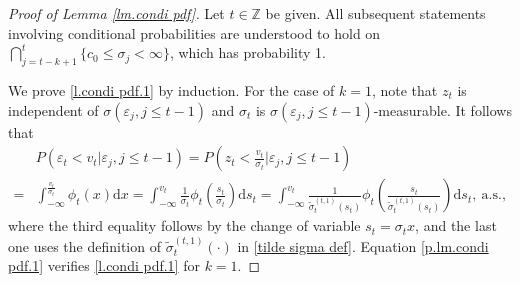 \documentclass[ejsv2]{imsart}
\theoremstyle{plain}
\theoremstyle{definition}
\theoremstyle{remark}
\begin{document}
\begin{proof}[Proof of Lemma \ref{lm.condi pdf}]
Let $t \in \mathbb{Z}$ be given.
All subsequent statements involving
conditional probabilities are understood
to hold on $\bigcap_{j=t-k+1}^{t}\{c_0 \leq \sigma_{j} <\infty\}$, which
has probability 1.

We prove \eqref{l.condi pdf.1} 
by induction.
For the case of $k=1$, note that $z_t$ is independent of $\sigma(\varepsilon_{j},j\leq t-1)$ and 
$\sigma_{t}$ is $\sigma(\varepsilon_j,j\leq t-1)$-measurable. It follows that
\begin{equation}\label{p.lm.condi pdf.1}
\begin{split}
    &P(\varepsilon_t<v_t|\varepsilon_{j},j\leq t-1)= P(z_t<\frac{v_t}{\sigma_{t}}|\varepsilon_{j},j\leq t-1) \\
    =&  \int_{-\infty}^{\frac{v_t}{\sigma_{t}}}\phi_t(x)\mathrm{d}x 
   = \int_{-\infty}^{v_{t}}\frac{1}{\sigma_{t}}\phi_{t}(\frac{s_t}{\sigma_{t}})\mathrm{d}s_t
   = \int_{-\infty}^{v_{t}}\frac{1}{\tilde{\sigma}^{(t,1)}_{t}(s_t)}\phi_{t}(\frac{s_t}{\tilde{\sigma}^{(t,1)}_{t}(s_t)})\mathrm{d}s_t,\ \textrm{a.s.},
\end{split}
\end{equation}
where the third equality follows by the change of variable $s_t=\sigma_{t}x$, and the last one
uses the definition of $\tilde{\sigma}^{(t,1)}_{t}(\cdot)$ in \eqref{tilde sigma def}. Equation \eqref{p.lm.condi pdf.1} verifies \eqref{l.condi pdf.1} for $k=1$. 


\end{proof}
\end{document}
